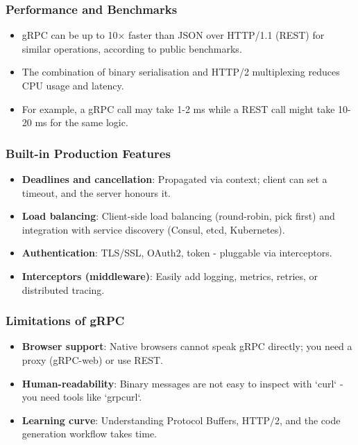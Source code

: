 \documentclass[10pt,a4paper]{article}
\begin{document}
\subsubsection{Performance and Benchmarks}
\begin{itemize}
    \item gRPC can be up to 10× faster than JSON over HTTP/1.1 (REST) for similar operations, according to public benchmarks.
    \item The combination of binary serialisation and HTTP/2 multiplexing reduces CPU usage and latency.
    \item For example, a gRPC call may take 1-2 ms while a REST call might take 10-20 ms for the same logic.
\end{itemize}

\subsubsection{Built-in Production Features}
\begin{itemize}
    \item \textbf{Deadlines and cancellation}: Propagated via context; client can set a timeout, and the server honours it.
    \item \textbf{Load balancing}: Client-side load balancing (round-robin, pick first) and integration with service discovery (Consul, etcd, Kubernetes).
    \item \textbf{Authentication}: TLS/SSL, OAuth2, token - pluggable via interceptors.
    \item \textbf{Interceptors (middleware)}: Easily add logging, metrics, retries, or distributed tracing.
\end{itemize}

\subsubsection{Limitations of gRPC}
\begin{itemize}
    \item \textbf{Browser support}: Native browsers cannot speak gRPC directly; you need a proxy (gRPC-web) or use REST.
    \item \textbf{Human-readability}: Binary messages are not easy to inspect with `curl` - you need tools like `grpcurl`.
    \item \textbf{Learning curve}: Understanding Protocol Buffers, HTTP/2, and the code generation workflow takes time.
\end{itemize}
\end{document}

